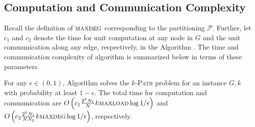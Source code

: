 \subsection{Computation and Communication Complexity}
\label{sec:compcomm}
Recall the definition of $\textsc{maxdeg}{}$ corresponding to the partitioning $\mathcal{P}$.
Further, let $c_1$ and $c_2$ denote the time for unit computation at any node in $G$
and the unit communication along any edge, respectively, in the Algorithm \parcircuitpath{}.
The time and communication complexity of algorithm \ouralgo{} is summarized below
in terms of these parameters. 

\begin{theorem}
\label{thm:parmaxwt}
For any $\epsilon\in(0, 1)$,
Algorithm \ouralgo{} solves the \textsc{$k$-Path} problem for an
instance $G, k$ with probability at least $1-\epsilon$. The total time for
computation and communication are $O\left(c_1\frac{2^kN_1}{N}k \textsc{maxload}{}\log{1/\epsilon}\right)$ 
and $O\left(c_2\frac{2^kN_1}{N N_2}k \textsc{maxdeg}{}\log{1/\epsilon}\right)$, respectively.
\end{theorem}
